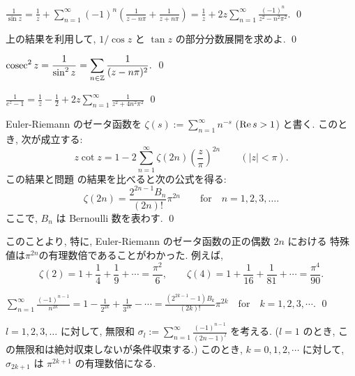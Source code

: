 \documentclass[12pt,twoside]{jarticle}
\def\cosec{\mathop{\mbox{\rm cosec}}\nolimits}
\begin{document}
\begin{question}
  \(\displaystyle
    \frac{1}{\sin z} 
    =
    \frac{1}{z}
    + \sum_{n=1}^\infty (-1)^n
    \left( \frac{1}{z - n\pi} + \frac{1}{z + n\pi} \right)
    =
    \frac{1}{z}
    + 2 z \sum_{n=1}^\infty \frac{(-1)^n}{z^2 - n^2\pi^2}.
  \)
  \qed
\end{question}

\begin{question}
  上の結果を利用して, $1/\cos z$ と $\tan z$ の部分分数展開を求めよ.
  \qed
\end{question}

\begin{question}\qstar{*}
  \(\displaystyle
    \cosec^2 z
    =
    \frac{1}{\sin^2 z} 
    =
    \sum_{n\in\Z} \frac{1}{(z-n\pi)^2}.
  \)
  \qed
\end{question}

\begin{question}
  \(\displaystyle
    \frac{1}{e^z - 1} 
    =
    \frac{1}{z}
    - \frac{1}{2}
    + 2 z \sum_{n=1}^\infty \frac{1}{z^2 + 4n^2\pi^2}
  \)
  \qed
\end{question}

\begin{question}\label{q:zcotz2}\qstar{*}
  Euler-Riemann のゼータ函数を $\zeta(s) := \sum_{n=1}^\infty n^{-s}$ 
  ($\mathop{\mathrm{Re}}\nolimits s > 1$) と書く. このとき, 次が成立する:
  \[
    z \cot z
    =
    1 - 2 \sum_{n=1}^\infty \zeta(2n) \left(\frac{z}{\pi}\right)^{2n}
    \qquad (|z| < \pi).
  \]
  この結果と問題  の結果を比べると次の公式を得る:
  \[
    \zeta(2n) = \frac{2^{2n-1}B_n}{(2n)!} \pi^{2n}
    \qquad
    \mbox{for}\quad n = 1,2,3,\dots.
  \]
  ここで, $B_n$ は Bernoulli 数を表わす.
  \qed
\end{question}

\noindent %
このことより, 特に, Euler-Riemann のゼータ函数の正の偶数 $2n$ における
特殊値は$\pi^{2n}$の有理数倍であることがわかった. 例えば,
\[
  \zeta(2) = 1 + \frac{1}{4} + \frac{1}{9} + \cdots = \frac{\pi^2}{6},
  \qquad
  \zeta(4) = 1 + \frac{1}{16} + \frac{1}{81} + \cdots = \frac{\pi^4}{90}.
\]

\begin{question}
  \quad
  \(\displaystyle
    \sum_{n=1}^\infty \frac{(-1)^{n-1}}{n^{2k}}
    = 1 - \frac{1}{2^{2k}} + \frac{1}{3^{2k}} - \cdots
    = \frac{(2^{2k-1}-1)B_k}{(2k)!}\pi^{2k}
    \quad
    \mbox{for}\quad k = 1,2,3,\cdots.
  \)
  \qed
\end{question}

\begin{question}
  $l=1,2,3,\dots$ に対して, 無限和 %
  \(\displaystyle
    \sigma_l := \sum_{n=1}^\infty \frac{(-1)^{n-1}}{(2n-1)^l}
  \)%
  を考える. ($l=1$ のとき, この無限和は絶対収束しないが条件収束する.) 
  このとき, $k=0,1,2,\cdots$ に対して, $\sigma_{2k+1}$ は $\pi^{2k+1}$ 
  の有理数倍になる.
\end{question}
\end{document}

